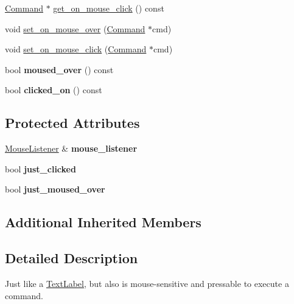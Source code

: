 \begin{DoxyCompactItemize}
\mbox{\hyperlink{class_command}{Command}} $\ast$ \mbox{\hyperlink{class_button_ac2a5c2151dc48940ac2e9c5f07c8dd6a}{get\+\_\+on\+\_\+mouse\+\_\+click}} () const
\item 
void \mbox{\hyperlink{class_button_a6133f9b42ae1192df54babd19dec9b80}{set\+\_\+on\+\_\+mouse\+\_\+over}} (\mbox{\hyperlink{class_command}{Command}} $\ast$cmd)
\item 
void \mbox{\hyperlink{class_button_a7b60123b8609254c811e3c3cc9d50d07}{set\+\_\+on\+\_\+mouse\+\_\+click}} (\mbox{\hyperlink{class_command}{Command}} $\ast$cmd)
\item 
\mbox{\label{class_button_a683998d86b16a7bf4196f3f59b134f95}} 
bool {\bfseries moused\+\_\+over} () const
\item 
\mbox{\label{class_button_a650782c10937ce67bb99aed737cd4ba1}} 
bool {\bfseries clicked\+\_\+on} () const
\end{DoxyCompactItemize}
\subsection*{Protected Attributes}
\begin{DoxyCompactItemize}
\item 
\mbox{\label{class_button_aab6aafaa6740925acb9c69c62f68aa7e}} 
\mbox{\hyperlink{class_mouse_listener}{Mouse\+Listener}} \& {\bfseries mouse\+\_\+listener}
\item 
\mbox{\label{class_button_a004237b359d7783fdfa3c7fc132dcd11}} 
bool {\bfseries just\+\_\+clicked}
\item 
\mbox{\label{class_button_a14e3262785a4dea5cded2c6542c09f2b}} 
bool {\bfseries just\+\_\+moused\+\_\+over}
\end{DoxyCompactItemize}
\subsection*{Additional Inherited Members}


\subsection{Detailed Description}
Just like a \mbox{\hyperlink{class_text_label}{Text\+Label}}, but also is mouse-\/sensitive and pressable to execute a command. 

